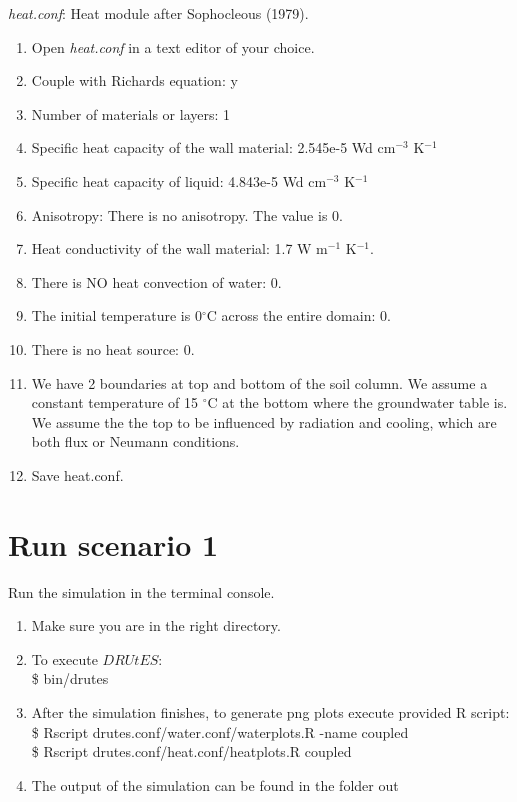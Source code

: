 \documentclass[
10pt, %
a4paper, %
oneside, %
headinclude,footinclude, %
BCOR5mm, %
]{scrartcl}
\begin{document}
\emph{heat.conf}: Heat module after Sophocleous (1979). 


\begin{enumerate}
\item Open \emph{heat.conf} in a text editor of your choice. 

\item Couple with Richards equation: y
\item Number of materials or layers: 1 
\item Specific heat capacity of the wall material:  2.545e-5 Wd cm$^{-3}$ K$^{-1}$ 
\item Specific heat capacity of liquid: 4.843e-5  Wd cm$^{-3}$ K$^{-1}$ 
\item Anisotropy: There is no anisotropy. The value is 0.
\item Heat conductivity of the wall material: 1.7 W m$^{-1}$ K$^{-1}$. 
\item There is NO heat convection of water: 0.
\item The initial temperature is 0$^{\circ}$C across the entire domain: 0.
\item There is no heat source: 0. 
\item We have 2 boundaries at top and bottom of the soil column. We assume a constant temperature of 15 $^{\circ}$C at the bottom where the groundwater table is. We assume the the top to be influenced by radiation and cooling, which are both flux or Neumann conditions. \\

\item Save heat.conf.
\end{enumerate}

\section*{Run scenario 1}
Run the simulation in the terminal console.
\begin{enumerate}
\item Make sure you are in the right directory. 
\item To execute $DRUtES$: \\
\$ bin/drutes
\item After the simulation finishes, to generate png plots execute provided R script: \\
\$ Rscript drutes.conf/water.conf/waterplots.R -name coupled \\
\$ Rscript drutes.conf/heat.conf/heatplots.R coupled
\item The output of the simulation can be found in the folder out
\end{enumerate}
\end{document}
